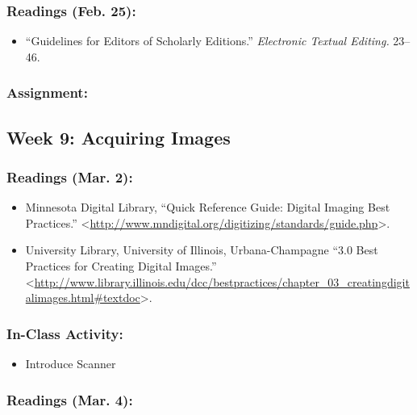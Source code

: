 \documentclass[]{article}
\begin{document}
\subsubsection{Readings (Feb. 25):}\label{readings-feb.-25}

\begin{itemize}
\itemsep1pt\parskip0pt
\item
  ``Guidelines for Editors of Scholarly Editions.'' \emph{Electronic
  Textual Editing.} 23--46.
\end{itemize}

\subsubsection{Assignment:}\label{assignment-2}

\subsection{Week 9: Acquiring Images}\label{week-9-acquiring-images}

\subsubsection{Readings (Mar. 2):}\label{readings-mar.-2}

\begin{itemize}
\itemsep1pt\parskip0pt
\item
  Minnesota Digital Library, ``Quick Reference Guide: Digital Imaging
  Best Practices.''
  \textless{}\url{http://www.mndigital.org/digitizing/standards/guide.php}\textgreater{}.
\item
  University Library, University of Illinois, Urbana-Champagne ``3.0
  Best Practices for Creating Digital Images.''
  \textless{}\url{http://www.library.illinois.edu/dcc/bestpractices/chapter_03_creatingdigitalimages.html\#textdoc}\textgreater{}.
\end{itemize}

\subsubsection{In-Class Activity:}\label{in-class-activity}

\begin{itemize}
\itemsep1pt\parskip0pt
\item
  Introduce Scanner
\end{itemize}

\subsubsection{Readings (Mar. 4):}\label{readings-mar.-4}
\end{document}

